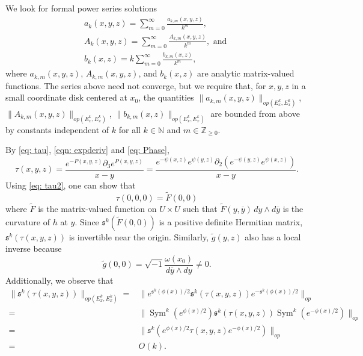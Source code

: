 \documentclass{amsart}
\theoremstyle{definition}
\theoremstyle{remark}
\numberwithin{equation}{section}
\DeclareMathOperator{\Sym}{Sym}
\begin{document}
We look for formal power series solutions
\begin{gather*}
a_k(x,y,z) = \sum_{m=0}^\infty \frac{a_{k,m}(x,y,z)}{k^m}, \\
A_k(x,y,z) = \sum_{m=0}^\infty \frac{A_{k,m}(x,y,z)}{k^m} , \text{ and } \\
b_k(x,z) = k\sum_{m=0}^\infty \frac{b_{k,m}(x,z)}{k^m},
\end{gather*}
where $a_{k,m}(x,y,z)$, $A_{k,m}(x,y,z)$, and $b_k(x,z)$ are analytic matrix-valued functions. The series above need not converge, but we require that, for $x,y,z$ in a small coordinate disk centered at $x_0$, the quantities $\|a_{k,m}(x,y,z)\|_{op(E^k_x,E^k_x)}$, $\|A_{k,m}(x,y,z)\|_{op(E^k_x,E^k_x)}$,   $\|b_{k,m}(x,z)\|_{op(E^k_x,E^k_x)}$ are bounded from above by constants independent of $k$ for all $k \in \mathbb{N}$ and $m \in \mathbb{Z}_{\geq 0}$.


By \eqref{eq: tau}, \eqref{eqn: expderiv} and \eqref{eq: Phase},
\begin{equation} \label{eq: tau2}
\tau(x,y,z) =  \frac{ e^{-P(x,y,z)} \partial_3 e^{P(x,y,z)}} {x-y} 
    = \frac{e^{-\psi(x,z)}e^{\psi(y,z)} \partial_2 \left ( e^{-\psi(y,z)} e^{\psi(x,z)} \right )}{ x-y}.
\end{equation}
Using \eqref{eq: tau2}, one can show that
$$
\tau(0,0,0) = \tilde{F}(0,0)
$$
where $\tilde{F}$ is the matrix-valued function on $U \times U$ such that $\tilde{F} (y,\overline{y})\,dy \wedge d \overline{y}$ is the curvature of $h$ at $y$. Since $\mathfrak{s}^k \left ( \tilde{F}(0,0) \right )$ is a positive definite Hermitian matrix, $\mathfrak{s}^k(\tau(x,y,z))$ is invertible near the origin. Similarly, $\tilde{g}(y,z)$ also has a local inverse because 
$$
\tilde{g}(0,0) = \sqrt{-1} \frac{\omega(x_0)}{d\overline{y} \wedge dy} \neq 0.
$$
Additionally, we observe that
\begin{equation*}
\begin{aligned}
\|\mathfrak{s}^k(\tau(x,y,z))\|_{op(E^k_x,E^k_x)} = & \|e^{\mathfrak{s}^k (\phi(x))/2}\mathfrak{s}^k(\tau(x,y,z)) e^{-\mathfrak{s}^k (\phi(x))/2}\|_{op} \\
    = \hspace{2pt} & \|\Sym^k (e^{\phi(x)/2})\mathfrak{s}^k(\tau(x,y,z)) \Sym^k(e^{-\phi(x)/2}) \|_{op} \\
    = \hspace{2pt} & \|\mathfrak{s}^k(e^{\phi(x)/2} \tau(x,y,z)e^{-\phi(x)/2})\|_{op} \\
    = \hspace{2pt} & O(k).
\end{aligned}
\end{equation*}
\end{document}
